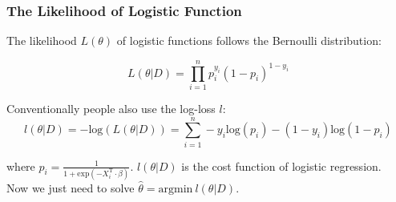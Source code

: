 \documentclass[10pt,aspectratio=169]{beamer}
\begin{document}
  \begin{frame}
    \frametitle{The Likelihood of Logistic Function}

    The likelihood $L(\theta)$ of logistic functions follows the
    Bernoulli distribution:

        \begin{equation*}
          L(\theta|D) = \prod_{i=1}^{n} p_{i}^{y_{i}} (1 - p_{i})^{1-y_{i}}
        \end{equation*}

   Conventionally people also use the log-loss $l$:
        \begin{equation*}
          l(\theta|D) = -\mathrm{log}(L(\theta|D)) = \sum_{i=1}^{n} -y_{i} \mathrm{log}(p_{i}) -  (1 - y_{i}) \mathrm{log}(1 - p_{i})
        \end{equation*}
        
        where $p_{i} = \frac{1}{1 + \mathrm{exp}(- X_{i}^{{\mathrm{T}}} \cdot \beta)}$.
        $l(\theta|D)$ is the cost function of logistic regression.
        \\
        
        Now we just need to solve $\hat{\theta} = \mathrm{argmin}\ l(\theta|D)$.
        
      \end{frame}
\end{document}
